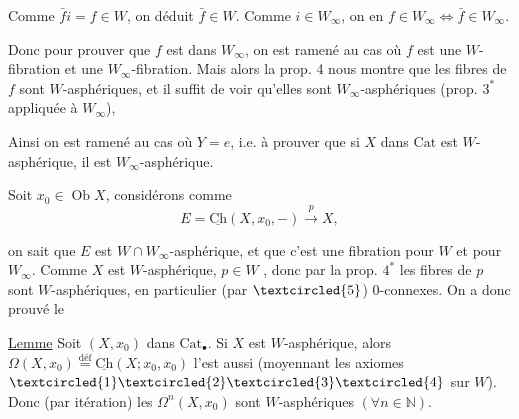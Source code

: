  Comme $\bar f i=f\in W$, on déduit $\bar f\in W$.  Comme $i\in W_\infty$, on en  $f\in W_\infty\Longleftrightarrow\bar f\in W_\infty$.

Donc pour prouver que $f$ est dans $W_\infty$, on est ramené au cas où $f$ est une $W$-fibration et une $W_\infty$-fibration. Mais alors la prop. 4 nous montre que les fibres de $f$ sont $W$-asphériques, et il suffit de voir qu'elles sont $W_\infty$-asphériques (prop. $3^*$ appliquée à $W_\infty$),



Ainsi on est ramené au cas où $Y=e$, i.e. à prouver que si $X$ dans $\mathrm{Cat}$ est $W$-asphérique, il est $W_\infty$-asphérique.  

Soit $x_0\in\operatorname{Ob}X$, considérons comme 
\[
 E=\underline{\mathrm{Ch}}(X,x_0,-)\xrightarrow{p}X,
\]

on sait que $E$ est $W\cap W_\infty$-asphérique, et que c'est une fibration pour $W$ et pour $W_\infty$. Comme $X$ est $W$-asphérique, $p\in W$ , donc  par la prop. $4^*$ les fibres de $p$ sont $W$-asphériques, en particulier (par $\textcircled{5}$) $0$-connexes. On a donc prouvé le



\uline{Lemme} Soit $(X,x_0)$ dans $\mathrm{Cat}_{\bullet}$. Si $X$ est $W$-asphérique, alors $\Omega(X,x_0)\overset{\text{déf}}{=}\underline{\mathrm{Ch}}(X;x_0,x_0)$  l'est aussi (moyennant les axiomes $\textcircled{1}\textcircled{2}\textcircled{3}\textcircled{4}$ sur $W$). Donc (par itération) les $\Omega^n(X,x_0)$ sont $W$-asphériques $(\forall n\in\mathbb N)$.


